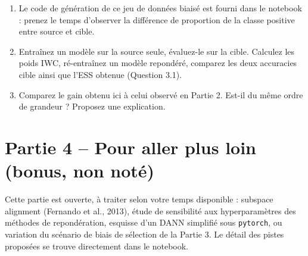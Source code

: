 \documentclass[11pt]{article}
\begin{document}
\begin{enumerate}
\item Le code de génération de ce jeu de données biaisé est fourni dans le notebook : prenez le
temps d'observer la différence de proportion de la classe positive entre source et cible.
\item Entraînez un modèle sur la source seule, évaluez-le sur la cible. Calculez les poids IWC,
ré-entraînez un modèle repondéré, comparez les deux accuracies cible ainsi que l'ESS obtenue
(Question 3.1).
\item Comparez le gain obtenu ici à celui observé en Partie 2. Est-il du même ordre de grandeur ?
Proposez une explication.
\end{enumerate}

\section{Partie 4 -- Pour aller plus loin (bonus, non noté)}

Cette partie est ouverte, à traiter selon votre temps disponible : subspace alignment (Fernando et
al., 2013), étude de sensibilité aux hyperparamètres des méthodes de repondération, esquisse d'un
DANN simplifié sous \texttt{pytorch}, ou variation du scénario de biais de sélection de la Partie 3.
Le détail des pistes proposées se trouve directement dans le notebook.
\end{document}
